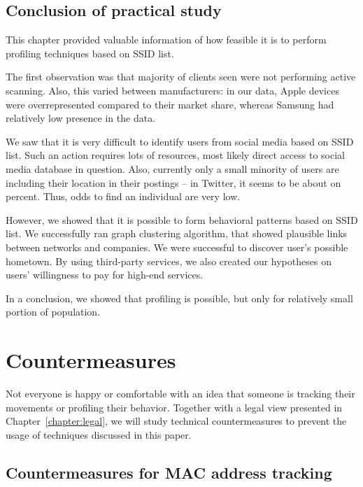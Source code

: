 \documentclass[12pt,a4paper,oneside,pdftex]{report}
\begin{document}
\section{Conclusion of practical study}
\label{sec:practical_conclusion}

This chapter provided valuable information of how feasible it is to perform profiling techniques based on SSID list.

The first observation was that majority of clients seen were not performing active scanning. Also, this varied between manufacturers: in our data, Apple devices were overrepresented compared to their market share, whereas Samsung had relatively low presence in the data.

We saw that it is very difficult to identify users from social media based on SSID list. Such an action requires lots of resources, most likely direct access to social media database in question. Also, currently only a small minority of users are including their location in their postings -- in Twitter, it seems to be about on percent. Thus, odds to find an individual are very low.

However, we showed that it is possible to form behavioral patterns based on SSID list. We successfully ran graph clustering algorithm, that showed plausible links between networks and companies. We were successful to discover user's possible hometown. By using third-party services, we also created our hypotheses on users' willingness to pay for high-end services.

In a conclusion, we showed that profiling is possible, but only for relatively small portion of population.



\chapter{Countermeasures}
\label{chapter:countermeasures}

Not everyone is happy or comfortable with an idea that someone is tracking their movements or profiling their behavior. Together with a legal view presented in Chapter~\ref{chapter:legal}, we will study technical countermeasures to prevent the usage of techniques discussed in this paper. 

\section{Countermeasures for MAC address tracking}
\end{document}
